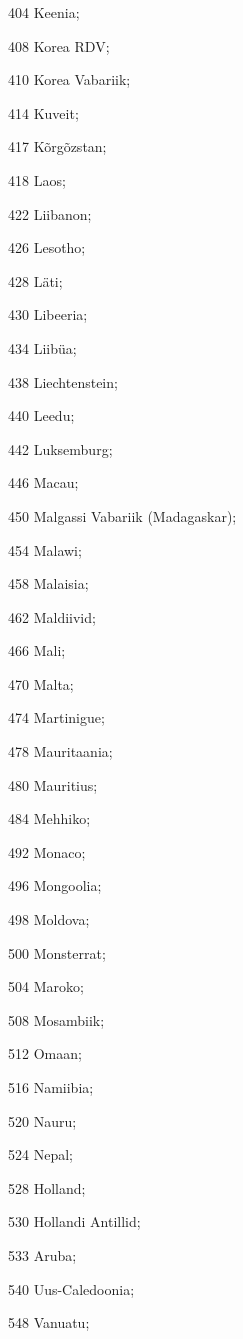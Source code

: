 \documentclass[a4paper]{article}
\begin{document}
\begin{description}
\begin{inparaitem}
    \item[404] Keenia;
    \item[408] Korea RDV;
    \item[410] Korea Vabariik;
    \item[414] Kuveit;
    \item[417] Kõrgõzstan;
    \item[418] Laos;
    \item[422] Liibanon;
    \item[426] Lesotho;
    \item[428] Läti;
    \item[430] Libeeria;
    \item[434] Liibüa;
    \item[438] Liechtenstein;
    \item[440] Leedu;
    \item[442] Luksemburg;
    \item[446] Macau;
    \item[450] Malgassi Vabariik (Madagaskar);
    \item[454] Malawi;
    \item[458] Malaisia;
    \item[462] Maldiivid;
    \item[466] Mali;
    \item[470] Malta;
    \item[474] Martinigue;
    \item[478] Mauritaania;
    \item[480] Mauritius;
    \item[484] Mehhiko;
    \item[492] Monaco;
    \item[496] Mongoolia;
    \item[498] Moldova;
    \item[500] Monsterrat;
    \item[504] Maroko;
    \item[508] Mosambiik;
    \item[512] Omaan;
    \item[516] Namiibia;
    \item[520] Nauru;
    \item[524] Nepal;
    \item[528] Holland;
    \item[530] Hollandi Antillid;
    \item[533] Aruba;
    \item[540] Uus-Caledoonia;
    \item[548] Vanuatu;

\end{inparaitem}
\end{description}
\end{document}
